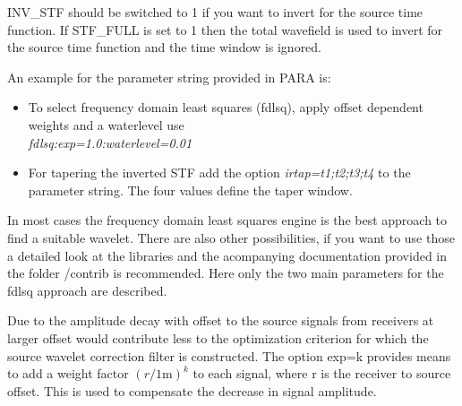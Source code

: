 {\color{blue}{\begin{verbatim}
"Definition of inversion for source time function" : "comment",
			"INV_STF" : "0",
			"PARA" : "fdlsq:exp=1.0",
			"N_STF" : "10",
			"N_STF_START" : "1",
			"TAPER_STF" : "0",
			
			"TRKILL_STF" : "0", 
			"TRKILL_FILE_STF" : "./trace_kill/trace_kill",
			"STF_FULL" : "0",
			"TRKILL_STF_OFFSET" : "0", 
			"TRKILL_STF_OFFSET_LOWER" : "10",
			"TRKILL_STF_OFFSET_UPPER" : "20",
			"TRKILL_STF_OFFSET_INVERT" : "0",
\end{verbatim}}}

{\color{red}{\begin{verbatim}
Default values are:
	INV_STF=0
\end{verbatim}}}

INV\_STF should be switched to 1 if you want to invert for the source time function. If STF\_FULL is set to 1 then the total wavefield is used to invert for the source time function and the time window is ignored.
\newline

An example for the parameter string provided in PARA is:
\begin{itemize}
 \item To select frequency domain least squares (fdlsq), apply offset dependent weights and a waterlevel use\\
 \textit{fdlsq:exp=1.0:waterlevel=0.01}
 \item For tapering the inverted STF add the option \textit{irtap=t1;t2;t3;t4} to the parameter string. The four values define the taper window. %
\end{itemize}

In most cases the frequency domain least squares engine is the best approach to find a suitable wavelet. There are also other possibilities, if you want to use those a detailed look at the libraries and the acompanying documentation provided in the folder /contrib is recommended. Here only the two main parameters for the fdlsq approach are described.

Due to the amplitude decay with offset to the source signals from receivers at larger offset would contribute less to the optimization criterion for which the source wavelet correction filter is constructed. The option exp=k provides means to add a weight factor $(r/1\text{m})^k$ to each signal, where r is the receiver to source offset. This is used to compensate the decrease in signal amplitude.

